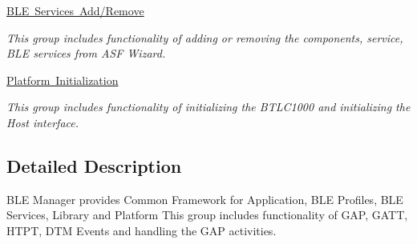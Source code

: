 \begin{DoxyCompactItemize}
\mbox{\hyperlink{group__ble__manager__service__addition}{B\+L\+E Services Add/\+Remove}}
\begin{DoxyCompactList}\small\item\em This group includes functionality of adding or removing the components, service, B\+LE services from A\+SF Wizard. \end{DoxyCompactList}\item 
\mbox{\hyperlink{group__ble__manager__platform__initialization}{Platform Initialization}}
\begin{DoxyCompactList}\small\item\em This group includes functionality of initializing the B\+T\+L\+C1000 and initializing the Host interface. \end{DoxyCompactList}\end{DoxyCompactItemize}


\subsection{Detailed Description}
B\+LE Manager provides Common Framework for Application, B\+LE Profiles, B\+LE Services, Library and Platform This group includes functionality of G\+AP, G\+A\+TT, H\+T\+PT, D\+TM Events and handling the G\+AP activities. 

